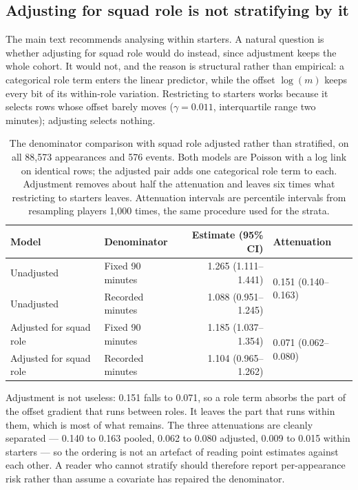 \documentclass[11pt]{article}
\begin{document}
\subsection*{Adjusting for squad role is not stratifying by it}

The main text recommends analysing within starters. A natural question is whether adjusting for squad role would do instead, since adjustment keeps the whole cohort. It would not, and the reason is structural rather than empirical: a categorical role term enters the linear predictor, while the offset $\log(m)$ keeps every bit of its within-role variation. Restricting to starters works because it selects rows whose offset barely moves ($\gamma=0.011$, interquartile range two minutes); adjusting selects nothing.

\begin{table}[h]
\centering
\caption{The denominator comparison with squad role adjusted rather than stratified, on all 88,573 appearances and 576 events. Both models are Poisson with a log link on identical rows; the adjusted pair adds one categorical role term to each. Adjustment removes about half the attenuation and leaves six times what restricting to starters leaves. Attenuation intervals are percentile intervals from resampling players 1,000 times, the same procedure used for the strata.}
\label{tab:supp_role_adjusted}
\small
\begin{tabular}{llrl}
\toprule
Model & Denominator & Estimate (95\% CI) & Attenuation\\
\midrule
Unadjusted & Fixed 90 minutes & 1.265 (1.111--1.441) & \multirow{2}{*}{0.151 (0.140--0.163)}\\
Unadjusted & Recorded minutes & 1.088 (0.951--1.245) & \\
Adjusted for squad role & Fixed 90 minutes & 1.185 (1.037--1.354) & \multirow{2}{*}{0.071 (0.062--0.080)}\\
Adjusted for squad role & Recorded minutes & 1.104 (0.965--1.262) & \\
\bottomrule
\end{tabular}
\end{table}

Adjustment is not useless: 0.151 falls to 0.071, so a role term absorbs the part of the offset gradient that runs between roles. It leaves the part that runs within them, which is most of what remains. The three attenuations are cleanly separated --- 0.140 to 0.163 pooled, 0.062 to 0.080 adjusted, 0.009 to 0.015 within starters --- so the ordering is not an artefact of reading point estimates against each other. A reader who cannot stratify should therefore report per-appearance risk rather than assume a covariate has repaired the denominator.
\end{document}

